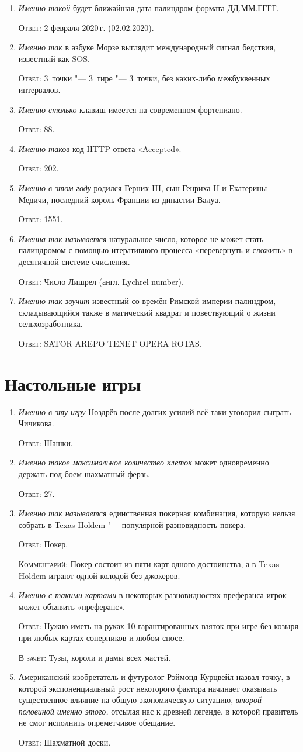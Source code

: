 \documentclass[a4paper,10pt]{article}
\let\keyword\textsc
\newenvironment{topic}{\begin{enumerate}}{\end{enumerate}}
\newcommand{\question}[3]{\item[#1.] #2 \par \keyword{Ответ:} #3}
\newcommand{\alternative}[1]{\par \keyword{В зачёт:} #1}
\newcommand{\commentary}[1]{\par \keyword{Комментарий:} #1}
\newcommand{\additional}{$\Im$}
\begin{document}
\begin{topic}
 \question{\additional}{\emph{Именно такой} будет ближайшая дата-палиндром формата ДД.ММ.ГГГГ.}{2 февраля 2020\,г. (02.02.2020).}
 \question{\additional}{\emph{Именно так} в азбуке Морзе выглядит международный сигнал бедствия, известный как SOS.}{3~точки "--- 3~тире "--- 3~точки, без каких-либо межбуквенных интервалов.}
 \question{10}{\emph{Именно столько} клавиш имеется на современном фортепиано.}{88.}
 \question{20}{\emph{Именно таков} код HTTP-ответа «Accepted».}{202.}
 \question{30}{\emph{Именно в этом году} родился Герних III, сын Генриха II и Екатерины Медичи, последний король Франции из династии Валуа.}{1551.}
 \question{40}{\emph{Именна так называется} натуральное число, которое не может стать палиндромом с помощью итеративного процесса «перевернуть и сложить» в десятичной системе счисления.}{Число Лишрел (англ. Lychrel number).}
 \question{50}{\emph{Именно так звучит} известный со времён Римской империи палиндром, складывающийся также в магический квадрат и повествующий о жизни сельхозработника.}{SATOR AREPO TENET OPERA ROTAS.}
\end{topic}


\section{Настольные игры}

\begin{topic}
 \question{10}{\emph{Именно в эту игру} Ноздрёв после долгих усилий всё-таки уговорил сыграть Чичикова.}{Шашки.}
 \question{20}{\emph{Именно такое максимальное количество клеток} может одновременно держать под боем шахматный ферзь.}{27.}
 \question{30}{\emph{Именно так называется} единственная покерная комбинация, которую нельзя собрать в Texas Holdem "--- популярной разновидность покера.}{Покер.}\commentary{Покер состоит из пяти карт одного достоинства, а в Texas Holdem играют одной колодой без джокеров.}
 \question{40}{\emph{Именно с такими картами} в некоторых разновидностях преферанса игрок может объявить «преферанс».}{Нужно иметь на руках 10 гарантированных взяток при игре без козыря при любых картах соперников и любом сносе.}\alternative{Тузы, короли и дамы всех мастей.}
 \question{50}{Американский изобретатель и футуролог Рэймонд Курцвейл назвал точку, в которой экспоненциальный рост некоторого фактора начинает оказывать существенное влияние на общую экономическую ситуацию, \emph{второй половиной именно этого,} отсылая нас к древней легенде, в которой правитель не смог исполнить опреметчивое обещание.}{Шахматной доски.}
\end{topic}
\end{document}
